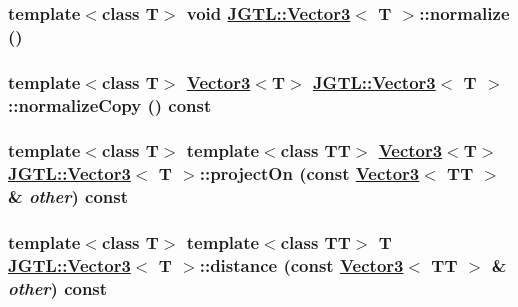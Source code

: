\hypertarget{class_j_g_t_l_1_1_vector3_9d567b7f1c468d29f1d310e2e8febd99}{
\subsubsection[normalize]{\setlength{\rightskip}{0pt plus 5cm}template$<$class T$>$ void \hyperlink{class_j_g_t_l_1_1_vector3}{JGTL::Vector3}$<$ T $>$::normalize ()}}
\label{class_j_g_t_l_1_1_vector3_9d567b7f1c468d29f1d310e2e8febd99}


\hypertarget{class_j_g_t_l_1_1_vector3_11253802e62f75a42e95c4dc93404e9d}{
\subsubsection[normalizeCopy]{\setlength{\rightskip}{0pt plus 5cm}template$<$class T$>$ \hyperlink{class_j_g_t_l_1_1_vector3}{Vector3}$<$T$>$ \hyperlink{class_j_g_t_l_1_1_vector3}{JGTL::Vector3}$<$ T $>$::normalize\-Copy () const}}
\label{class_j_g_t_l_1_1_vector3_11253802e62f75a42e95c4dc93404e9d}


\hypertarget{class_j_g_t_l_1_1_vector3_5393d864b2849e116b2a990d31ccbb9c}{
\subsubsection[projectOn]{\setlength{\rightskip}{0pt plus 5cm}template$<$class T$>$ template$<$class TT$>$ \hyperlink{class_j_g_t_l_1_1_vector3}{Vector3}$<$T$>$ \hyperlink{class_j_g_t_l_1_1_vector3}{JGTL::Vector3}$<$ T $>$::project\-On (const \hyperlink{class_j_g_t_l_1_1_vector3}{Vector3}$<$ TT $>$ \& {\em other}) const}}
\label{class_j_g_t_l_1_1_vector3_5393d864b2849e116b2a990d31ccbb9c}


\hypertarget{class_j_g_t_l_1_1_vector3_be8052114fb0572253a460583032166c}{
\subsubsection[distance]{\setlength{\rightskip}{0pt plus 5cm}template$<$class T$>$ template$<$class TT$>$ T \hyperlink{class_j_g_t_l_1_1_vector3}{JGTL::Vector3}$<$ T $>$::distance (const \hyperlink{class_j_g_t_l_1_1_vector3}{Vector3}$<$ TT $>$ \& {\em other}) const}}
\label{class_j_g_t_l_1_1_vector3_be8052114fb0572253a460583032166c}


